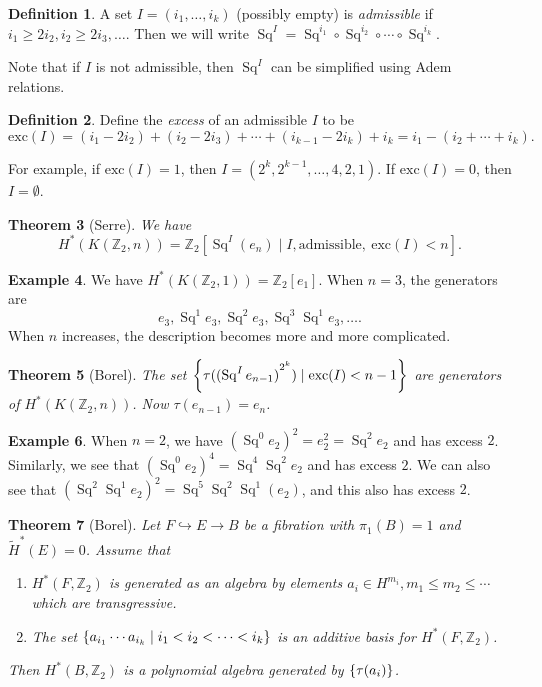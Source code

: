 \documentclass[leqno, openany]{memoir}
\newtheorem{thm}{Theorem}[section]
\theoremstyle{definition}
\newtheorem{defn}[thm]{Definition}
\newtheorem{exm}[thm]{Example}
\theoremstyle{remark}
\theoremstyle{plain}
\theoremstyle{definition}
\theoremstyle{remark}
\newcommand{\Z}{\mathbb{Z}}
\newcommand{\mr}[1]{\mathrm{#1}}
\newcommand{\wt}[1]{\widetilde{#1}}
\DeclareMathOperator{\Sq}{Sq}
\begin{document}
\begin{defn}
    A set $I = (i_1, \ldots, i_k)$ (possibly empty) is \textit{admissible} if $i_1 \geq 2 i_2, i_2 \geq 2 i_3, \ldots$. Then we will write $\Sq^I = \Sq^{i_1} \circ \Sq^{i_2} \circ \cdots \circ \Sq^{i_k}$.
\end{defn}

Note that if $I$ is not admissible, then $\Sq^I$ can be simplified using Adem relations.

\begin{defn}
    Define the \textit{excess} of an admissible $I$ to be 
    \[ \mr{exc}(I) = (i_1 - 2 i_2) + (i_2 - 2 i_3) + \cdots + (i_{k-1} - 2 i_k) + i_k = i_1 - (i_2 + \cdots + i_k). \]
\end{defn}

For example, if $\mr{exc}(I) = 1$, then $I = (2^k, 2^{k-1}, \ldots, 4, 2, 1)$. If $\mr{exc}(I) = 0$, then $I = \emptyset$.

\begin{thm}[Serre]
    We have
    \[ H^*(K( \Z_2, n )) = \Z_2 [\Sq^I (e_n) \mid I, \text{admissible},\ \mr{exc}(I) < n]. \]
\end{thm}

\begin{exm}
    We have $H^*(K(\Z_2, 1)) = \Z_2[e_1]$. When $n=3$, the generators are 
    \[ e_3, \Sq^1 e_3, \Sq^2 e_3, \Sq^3 \Sq^1 e_3, \ldots. \] 
    When $n$ increases, the description becomes more and more complicated.
\end{exm}

\begin{thm}[Borel]
    The set $\qty{\tau({(\Sq^I e_{n-1})}^{2^k}) \mid \mr{exc}(I) < n-1}$ are generators of $H^*(K(\Z_2, n))$. Now $\tau(e_{n-1}) = e_n$.
\end{thm}

\begin{exm}
    When $n = 2$, we have ${( \Sq^0 e_2 )}^2 = e_2^2 = \Sq^2 e_2$ and has excess $2$. Similarly, we see that ${(\Sq^0 e_2)}^4 = \Sq^4 \Sq^2 e_2$ and has excess $2$. We can also see that ${(\Sq^2 \Sq^1 e_2)}^2 = \Sq^5 \Sq^2 \Sq^1 (e_2)$, and this also has excess $2$.
\end{exm}

\begin{thm}[Borel]
    Let $F \hookrightarrow E \to B$ be a fibration with $\pi_1(B) = 1$ and $\wt{H}^*(E) = 0$. Assume that
    \begin{enumerate}
        \item $H^*(F, \Z_2)$ is generated as an algebra by elements $a_i \in H^{m_i}, m_1 \leq m_2 \leq \cdots$ which are transgressive.
        \item The set $\qty{a_{i_1} \cdots a_{i_k} \mid i_1 < i_2 < \cdots < i_k}$ is an additive basis for $H^*(F, \Z_2)$.
    \end{enumerate}
    Then $H^*(B, \Z_2)$ is a polynomial algebra generated by $\qty{\tau (a_i)}$.
\end{thm}
\end{document}
